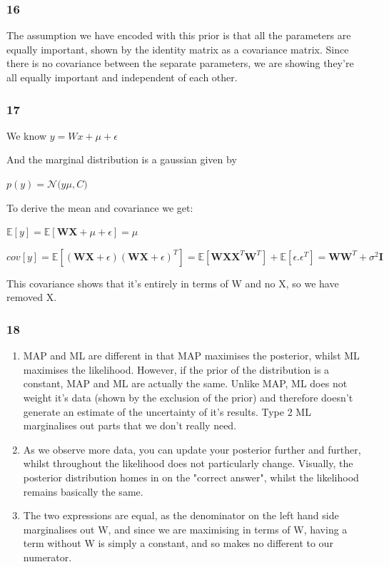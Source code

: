 \documentclass[11pt]{article}
\begin{document}
    \subsubsection*{16}\label{section}

The assumption we have encoded with this prior is that all the
parameters are equally important, shown by the identity matrix as a
covariance matrix. Since there is no covariance between the separate
parameters, we are showing they're all equally important and independent
of each other.

    \subsubsection*{17}\label{section}

We know \(y = Wx + \mu + \epsilon\)

And the marginal distribution is a gaussian given by

\(p(y) = \mathcal{N}(y\)\textbar{}\(\mu, C)\)

To derive the mean and covariance we get:

\(\mathbb E[y] = \mathbb E[\pmb W\pmb X + \mu + \epsilon] = \mu\)

\(cov[y] = \mathbb E[(\pmb W\pmb X + \epsilon)(\pmb W\pmb X + \epsilon)^T] = \mathbb E[\pmb W\pmb X\pmb X^T\pmb W^T] + \mathbb E[\epsilon.\epsilon^T] = \pmb W\pmb W^T + \sigma^2\pmb I\)

This covariance shows that it's entirely in terms of W and no X, so we
have removed X.

    \subsubsection*{18}\label{section}

\begin{enumerate}
\def\labelenumi{\alph{enumi})}
\item
  MAP and ML are different in that MAP maximises the posterior, whilst
  ML maximises the likelihood. However, if the prior of the distribution
  is a constant, MAP and ML are actually the same. Unlike MAP, ML does
  not weight it's data (shown by the exclusion of the prior) and
  therefore doesn't generate an estimate of the uncertainty of it's
  results. Type 2 ML marginalises out parts that we don't really need.
\item
  As we observe more data, you can update your posterior further and
  further, whilst throughout the likelihood does not particularly
  change. Visually, the posterior distribution homes in on the "correct
  answer", whilst the likelihood remains basically the same.
\item
  The two expressions are equal, as the denominator on the left hand
  side marginalises out W, and since we are maximising in terms of W,
  having a term without W is simply a constant, and so makes no
  different to our numerator.
\end{enumerate}
\end{document}
